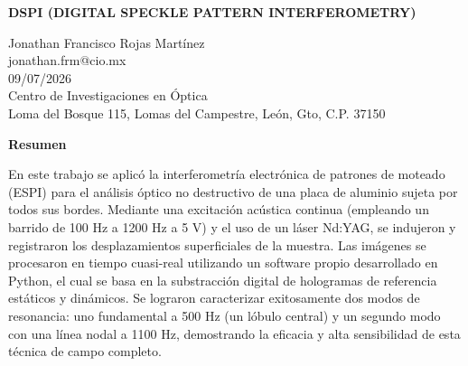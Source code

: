 \documentclass[letterpaper]{article}
\begin{document}
	
	\begin{center}
		\Large \textbf{DSPI (DIGITAL SPECKLE PATTERN INTERFEROMETRY)}
	\end{center}
	
	\begin{center}
		Jonathan Francisco Rojas Martínez\\
		jonathan.frm@cio.mx\\
		09/07/2026\\
		Centro de Investigaciones en Óptica\\
		Loma del Bosque 115, Lomas del Campestre, León, Gto, C.P. 37150
	\end{center}
	
	\begin{center}
		{\Large \textbf{Resumen}}
	\end{center}
	
	\noindent
	En este trabajo se aplicó la interferometría electrónica de patrones de moteado (ESPI) para el análisis óptico no destructivo de una placa de aluminio sujeta por todos sus bordes. Mediante una excitación acústica continua (empleando un barrido de 100 Hz a 1200 Hz a 5 V) y el uso de un láser Nd:YAG, se indujeron y registraron los desplazamientos superficiales de la muestra. Las imágenes se procesaron en tiempo cuasi-real utilizando un software propio desarrollado en Python, el cual se basa en la substracción digital de hologramas de referencia estáticos y dinámicos. Se lograron caracterizar exitosamente dos modos de resonancia: uno fundamental a 500 Hz (un lóbulo central) y un segundo modo con una línea nodal a 1100 Hz, demostrando la eficacia y alta sensibilidad de esta técnica de campo completo.
	
\end{document}
